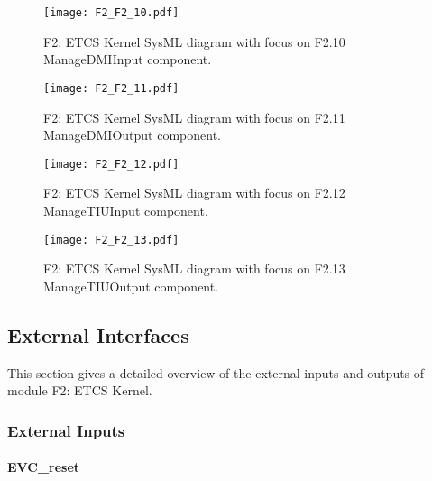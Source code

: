 \begin{figure}
\center
\texttt{[image: F2\_F2\_10.pdf]}
\caption{F2: ETCS Kernel SysML diagram with focus on F2.10 ManageDMIInput component.}\label{f:f2.10_overview}
\end{figure}

\begin{figure}
\center
\texttt{[image: F2\_F2\_11.pdf]}
\caption{F2: ETCS Kernel SysML diagram with focus on F2.11 ManageDMIOutput component.}\label{f:f2.11_overview}
\end{figure}

\begin{figure}
\center
\texttt{[image: F2\_F2\_12.pdf]}
\caption{F2: ETCS Kernel SysML diagram with focus on F2.12 ManageTIUInput component.}\label{f:f2.12_overview}
\end{figure}

\begin{figure}
\center
\texttt{[image: F2\_F2\_13.pdf]}
\caption{F2: ETCS Kernel SysML diagram with focus on F2.13 ManageTIUOutput component.}\label{f:f2.13_overview}
\end{figure}
















\subsection{External Interfaces}
This section gives a detailed overview of the external inputs and outputs of module F2: ETCS Kernel.

\subsubsection{External Inputs}

\paragraph{EVC\_reset}


